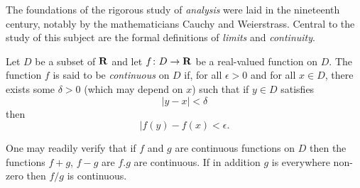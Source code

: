\documentclass[a4paper,12pt]{article}
\begin{document}
The foundations of the rigorous study of \emph{analysis}
were laid in the nineteenth century, notably by the mathematicians
Cauchy and Weierstrass. Central to the study of this subject are 
the formal definitions of \emph{limits} and \emph{continuity}.

Let $D$ be a subset of $\bf R$ and let $f \colon D \to \bf{R}$
be a real-valued function on $D$. The function $f$ is said to be 
\emph{continuous} on $D$ if, for all $\epsilon > 0$ and for all $x
\in D$, there exists some $\delta > 0$ (which may depend on $x$)
such that if $y \in D$ satisfies \[ |y - x| < \delta \]
then 
\[ |f(y) - f(x) < \epsilon. \]

One may readily verify that if $f$ and $g$ are continuous functions
on $D$ then the functions $f+g$, $f-g$ are $f.g$ are continuous.
If in addition $g$ is everywhere non-zero then $f/g$ is continuous.
\end{document}
